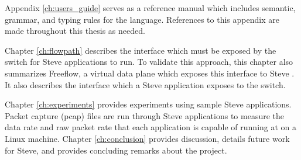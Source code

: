 Appendix \ref{ch:users_guide} serves as a reference
manual which includes semantic, grammar, and typing rules for the language. References to this appendix are made throughout this thesis as needed.

Chapter \ref{ch:flowpath} describes the interface which must be exposed by the switch for Steve applications to run. To validate this approach, this chapter also summarizes Freeflow, a virtual data plane which exposes this interface to Steve \cite{freeflow_software}. It also describes the interface which a Steve application exposes to the switch.

Chapter \ref{ch:experiments} provides experiments using sample Steve
applications. Packet capture (pcap) files are run through Steve applications to measure the data
rate and raw packet rate that each application is capable of running at on a
Linux machine.
Chapter \ref{ch:conclusion} provides discussion, details future work for Steve, and provides concluding remarks about the project.